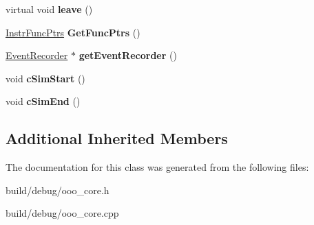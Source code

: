 \begin{DoxyCompactItemize}
\item 
\hypertarget{classOOOCore_a35d1dbd0be01c0257dde3a95849ae46f}{virtual void {\bfseries leave} ()}\label{classOOOCore_a35d1dbd0be01c0257dde3a95849ae46f}

\item 
\hypertarget{classOOOCore_a0c7eb74407545d47223ab0975ffc8a0e}{\hyperlink{structInstrFuncPtrs}{Instr\-Func\-Ptrs} {\bfseries Get\-Func\-Ptrs} ()}\label{classOOOCore_a0c7eb74407545d47223ab0975ffc8a0e}

\item 
\hypertarget{classOOOCore_ab70925f444691d37172dd593df14d7de}{\hyperlink{classEventRecorder}{Event\-Recorder} $\ast$ {\bfseries get\-Event\-Recorder} ()}\label{classOOOCore_ab70925f444691d37172dd593df14d7de}

\item 
\hypertarget{classOOOCore_a005b405bed0f1f23b419be5cdff68736}{void {\bfseries c\-Sim\-Start} ()}\label{classOOOCore_a005b405bed0f1f23b419be5cdff68736}

\item 
\hypertarget{classOOOCore_a7aee253f36e45cf018589efa8e2c98b2}{void {\bfseries c\-Sim\-End} ()}\label{classOOOCore_a7aee253f36e45cf018589efa8e2c98b2}

\end{DoxyCompactItemize}
\subsection*{Additional Inherited Members}


The documentation for this class was generated from the following files\-:\begin{DoxyCompactItemize}
\item 
build/debug/ooo\-\_\-core.\-h\item 
build/debug/ooo\-\_\-core.\-cpp\end{DoxyCompactItemize}
